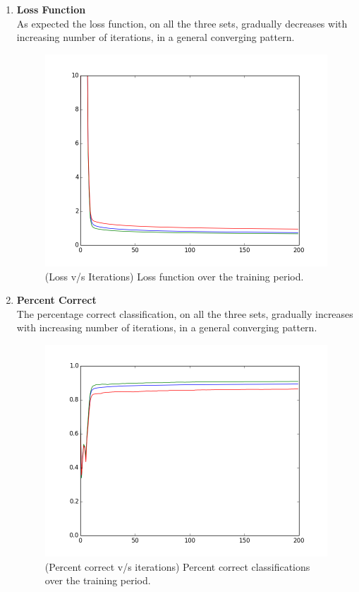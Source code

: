 \documentclass[11pt,twoside]{article}
\begin{document}
\begin{enumerate}[label=(\alph*)]

\item \textbf{Loss Function}\\
As expected the loss function, on all the three sets, gradually decreases with increasing number of iterations, in a general converging pattern.
\begin{figure}[H]
  \includegraphics[width=0.45\columnwidth]{softmaxloss}
  \centering
  \caption{(Loss v/s Iterations) Loss function over the training period.}
  \label{fig:6_b}
  \end{figure}
  
\item \textbf{Percent Correct}\\  
The percentage correct classification, on all the three sets, gradually increases with increasing number of iterations, in a general converging pattern.
\begin{figure}[H]
  \includegraphics[width=0.45\columnwidth]{softmaxcorrect}
  \centering
  \caption{(Percent correct v/s iterations) Percent correct classifications over the training period.}
  \label{fig:6_b}
  \end{figure}
\end{enumerate}
\end{document}
